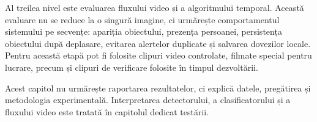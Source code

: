 Al treilea nivel este evaluarea fluxului video și a algoritmului temporal. Această evaluare nu se reduce la o singură imagine, ci urmărește comportamentul sistemului pe secvențe: apariția obiectului, prezența persoanei, persistența obiectului după deplasare, evitarea alertelor duplicate și salvarea dovezilor locale. Pentru această etapă pot fi folosite clipuri video controlate, filmate special pentru lucrare, precum și clipuri de verificare folosite în timpul dezvoltării.

Acest capitol nu urmărește raportarea rezultatelor, ci explică datele, pregătirea și metodologia experimentală. Interpretarea detectorului, a clasificatorului și a fluxului video este tratată în capitolul dedicat testării.
